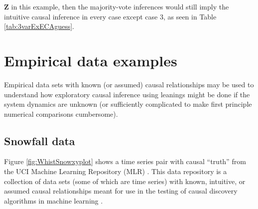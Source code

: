 $\mathbf{Z}$ in this example, then the majority-vote inferences would still imply the intuitive causal inference in every case except case 3, as seen in Table \ref{tab:3varExECAguess}.

\section{Empirical data examples}
\label{sec:emp}
Empirical data sets with known (or assumed) causal relationships may be used to understand how exploratory causal inference using leanings might be done if the system dynamics are unknown (or sufficiently complicated to make first principle numerical comparisons cumbersome).

\subsection{Snowfall data}
Figure \ref{fig:WhistSnowxyplot} shows a time series pair with causal ``truth'' from the UCI Machine Learning Repository (MLR) \cite{bache2013}.  This data repository is a collection of data sets (some of which are time series) with known, intuitive, or assumed causal relationships meant for use in the testing of causal discovery algorithms in machine learning \cite{bache2013}.

